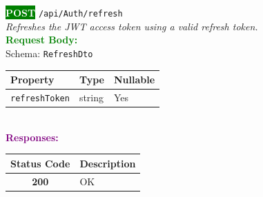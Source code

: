\begin{tcolorbox}[
    colback=green!5,
    colframe=green,
    arc=2mm,
    boxrule=1pt,
    left=5pt,
    right=5pt,
    top=5pt,
    bottom=5pt
]
\noindent\colorbox{green}{\textcolor{white}{\textbf{POST}}} 
\texttt{\large /api/Auth/refresh}\\[0.3em]
\textit{Refreshes the JWT access token using a valid refresh token.}\\[0.3em]
\vspace{0.3em}
\textbf{\textcolor{green}{Request Body:}}\\[0.2em]
Schema: \texttt{RefreshDto}\\[0.3em]
\begin{tabular}{|l|l|l|}
\hline
\rowcolor{green!10}
\textbf{Property} & \textbf{Type} & \textbf{Nullable} \\ \hline
\texttt{refreshToken} & string & Yes \\ \hline
\end{tabular}\\[0.5em]
\vspace{0.3em}
\textbf{\textcolor{purple}{Responses:}}\\[0.2em]
\begin{tabular}{|c|p{10cm}|}
\hline
\rowcolor{gray!20}
\textbf{Status Code} & \textbf{Description} \\ \hline
\colorbox{green!20}{\textbf{200}} & OK \\ \hline
\end{tabular}
\end{tcolorbox}
\vspace{0.5em}

